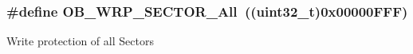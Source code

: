 \subsubsection[{\texorpdfstring{O\+B\+\_\+\+W\+R\+P\+\_\+\+S\+E\+C\+T\+O\+R\+\_\+\+All}{OB_WRP_SECTOR_All}}]{\setlength{\rightskip}{0pt plus 5cm}\#define O\+B\+\_\+\+W\+R\+P\+\_\+\+S\+E\+C\+T\+O\+R\+\_\+\+All~((uint32\+\_\+t)0x00000\+F\+F\+F)}\hypertarget{group___f_l_a_s_h_ex___option___bytes___write___protection_gaf120263891bca013cf4a9f64ac57b941}{}\label{group___f_l_a_s_h_ex___option___bytes___write___protection_gaf120263891bca013cf4a9f64ac57b941}
Write protection of all Sectors 